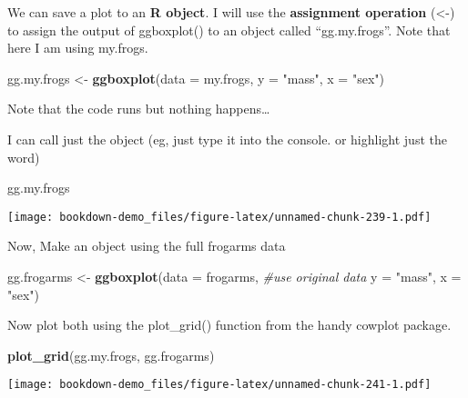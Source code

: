 \documentclass[]{book}
\newenvironment{Shaded}{\begin{snugshade}}{\end{snugshade}}
\newcommand{\KeywordTok}[1]{\textcolor[rgb]{0.13,0.29,0.53}{\textbf{#1}}}
\newcommand{\DataTypeTok}[1]{\textcolor[rgb]{0.13,0.29,0.53}{#1}}
\newcommand{\StringTok}[1]{\textcolor[rgb]{0.31,0.60,0.02}{#1}}
\newcommand{\CommentTok}[1]{\textcolor[rgb]{0.56,0.35,0.01}{\textit{#1}}}
\newcommand{\NormalTok}[1]{#1}
\theoremstyle{definition}
\theoremstyle{definition}
\theoremstyle{definition}
\theoremstyle{remark}
\begin{document}
We can save a plot to an \textbf{R object}. I will use the
\textbf{assignment operation} (\textless{}-) to assign the output of
ggboxplot() to an object called ``gg.my.frogs''. Note that here I am
using my.frogs.

\begin{Shaded}
\begin{Highlighting}[]
\NormalTok{gg.my.frogs <-}\StringTok{ }\KeywordTok{ggboxplot}\NormalTok{(}\DataTypeTok{data =}\NormalTok{ my.frogs,}
          \DataTypeTok{y =} \StringTok{"mass"}\NormalTok{,}
          \DataTypeTok{x =} \StringTok{"sex"}\NormalTok{)}
\end{Highlighting}
\end{Shaded}

Note that the code runs but nothing happens\ldots{}

I can call just the object (eg, just type it into the console. or
highlight just the word)

\begin{Shaded}
\begin{Highlighting}[]
\NormalTok{gg.my.frogs}
\end{Highlighting}
\end{Shaded}

\texttt{[image: bookdown-demo\_files/figure-latex/unnamed-chunk-239-1.pdf]}

Now, Make an object using the full frogarms data

\begin{Shaded}
\begin{Highlighting}[]
\NormalTok{gg.frogarms <-}\StringTok{ }\KeywordTok{ggboxplot}\NormalTok{(}\DataTypeTok{data =}\NormalTok{ frogarms, }\CommentTok{#use original data}
          \DataTypeTok{y =} \StringTok{"mass"}\NormalTok{,}
          \DataTypeTok{x =} \StringTok{"sex"}\NormalTok{)}
\end{Highlighting}
\end{Shaded}

Now plot both using the plot\_grid() function from the handy cowplot
package.

\begin{Shaded}
\begin{Highlighting}[]
\KeywordTok{plot_grid}\NormalTok{(gg.my.frogs,}
\NormalTok{          gg.frogarms)}
\end{Highlighting}
\end{Shaded}

\texttt{[image: bookdown-demo\_files/figure-latex/unnamed-chunk-241-1.pdf]}
\end{document}
